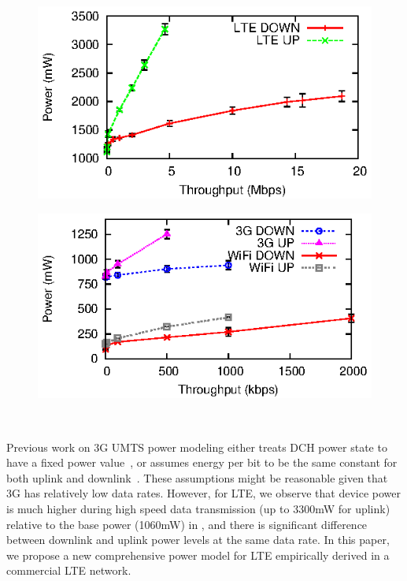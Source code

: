\begin{figure}[tp]
\centering
\begin{minipage}[b]{.49\textwidth}
\centering
\includegraphics[width=.99\textwidth]{figures/mobisys12/power_tp.eps}
\label{fig:power.tp}
\end{minipage}
\begin{minipage}[b]{.49\textwidth}
\centering
\includegraphics[width=.99\textwidth]{figures/mobisys12/power_tp2.eps}
\label{fig:power.tp2}
\end{minipage}
\end{figure}

\begin{figure}[t]
\centering
{} \\
\label{fig:up.down}
\end{figure}



\label{sec:updown}
Previous work on 3G UMTS power modeling either treats DCH power state to have a fixed power value~\cite{codes.powertutor, mobisys.aro}, or assumes energy per bit to be the same constant for both uplink and downlink~\cite{imc.tailender}. These assumptions might be reasonable given that 3G has relatively low data rates. However, for LTE, we observe that device power is much higher during high speed data transmission (up to 3300mW for uplink) relative to the base power (1060mW) in \RC, and there is significant difference between downlink and uplink power levels at the same data rate. In this paper, we propose a new comprehensive power model for LTE empirically derived in a commercial LTE network.

